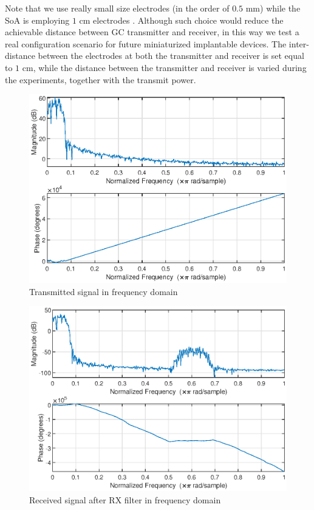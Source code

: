 Note that we use really small size electrodes (in the order of $0.5$ mm) while the SoA is employing $1$ cm electrodes \cite{Li2017}. Although such choice would reduce the achievable distance between GC transmitter and receiver, in this way we test a real configuration scenario for future miniaturized implantable devices. 
The inter-distance between the electrodes at both the transmitter and receiver is set equal to $1$ cm, while the distance between the transmitter and receiver is varied during the experiments, together with the transmit power.

\begin{figure}
	\includegraphics[width=\textwidth]{figures/GC_testbed/TX_freq.eps}
	\caption{Transmitted signal in frequency domain} \label{FigTXfreq}
\end{figure}

\begin{figure}
	\includegraphics[width=\textwidth]{figures/GC_testbed/RX_freq}
	\caption{Received signal after RX filter in frequency domain} \label{FigRXfreq}
\end{figure}

